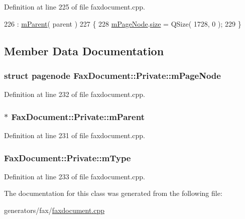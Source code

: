 Definition at line 225 of file faxdocument.\+cpp.


\begin{DoxyCode}
226             : \hyperlink{classFaxDocument_1_1Private_af79ad44bbe68d6da9c688ad119debd43}{mParent}( parent )
227         \{
228             \hyperlink{classFaxDocument_1_1Private_a4de794271a866e2252a16b5a3a57cea6}{mPageNode}.\hyperlink{classpagenode_a2be79286e9fc2179f6e3f97dc72a56fa}{size} = QSize( 1728, 0 );
229         \}
\end{DoxyCode}


\subsection{Member Data Documentation}
\hypertarget{classFaxDocument_1_1Private_a4de794271a866e2252a16b5a3a57cea6}{
\subsubsection[{m\+Page\+Node}]{\setlength{\rightskip}{0pt plus 5cm}struct {\bf pagenode} Fax\+Document\+::\+Private\+::m\+Page\+Node}}\label{classFaxDocument_1_1Private_a4de794271a866e2252a16b5a3a57cea6}


Definition at line 232 of file faxdocument.\+cpp.

\hypertarget{classFaxDocument_1_1Private_af79ad44bbe68d6da9c688ad119debd43}{
\subsubsection[{m\+Parent}]{$\ast$ Fax\+Document\+::\+Private\+::m\+Parent}}\label{classFaxDocument_1_1Private_af79ad44bbe68d6da9c688ad119debd43}


Definition at line 231 of file faxdocument.\+cpp.

\hypertarget{classFaxDocument_1_1Private_a7dada4c0e23573ffabc6095247365670}{
\subsubsection[{m\+Type}]{ Fax\+Document\+::\+Private\+::m\+Type}}\label{classFaxDocument_1_1Private_a7dada4c0e23573ffabc6095247365670}


Definition at line 233 of file faxdocument.\+cpp.



The documentation for this class was generated from the following file\+:\begin{DoxyCompactItemize}
\item 
generators/fax/\hyperlink{faxdocument_8cpp}{faxdocument.\+cpp}\end{DoxyCompactItemize}

